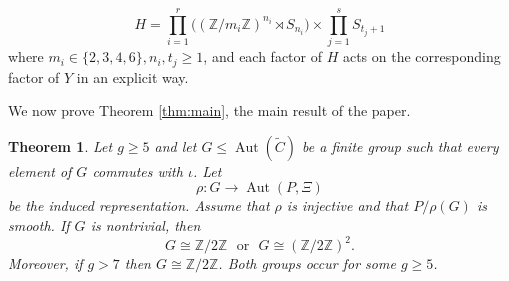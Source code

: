 \documentclass{article}
\newtheorem{thm}{Theorem}[section]
\numberwithin{equation}{section}
\newcommand{\ZZ}{\mathbb Z}
\DeclareMathOperator{\Aut}{Aut}
\begin{document}
\[
H=\prod_{i=1}^r\bigl(\left(\mathbb{Z} / m_i \mathbb{Z}\right)^{n_i} \rtimes S_{n_i}\bigr) \times \prod_{j=1}^s S_{t_j+1}
\]
where \(m_i \in\{2,3,4,6\}, n_i, t_j \geq 1\), and each factor of \(H\) acts on the corresponding factor of \(Y\) in an explicit way.

We now prove Theorem \ref{thm:main}, the main result of the paper.

\begin{thm}
\label{thm41}
Let $g\geq5$ and let $G\leq \Aut(\widetilde C)$ be a finite group such that every element of $G$ commutes with $\iota$. Let
$$\rho: G\longrightarrow \Aut(P,\Xi)$$
be the induced representation. Assume that $\rho$ is injective and that $P/\rho(G)$ is smooth. If $G$ is nontrivial, then $$G\cong \ZZ/2\ZZ \ \ \ \text{or}\ \ \ G\cong (\ZZ/2\ZZ)^2.$$
Moreover, if $g > 7$ then $G\cong \ZZ/2\ZZ$. 
Both groups occur for some $g \geq 5$.
\end{thm}
\end{document}
